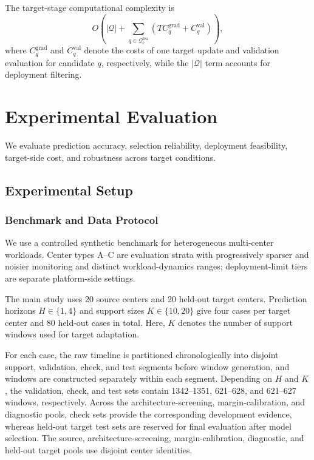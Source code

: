 \documentclass[a4paper,fleqn]{cas-sc}
\begin{document}
The target-stage computational complexity is
\[
O\left(
|\mathcal{Q}|+
\sum_{q\in\mathcal{Q}_{c}^{\mathrm{fea}}}
\left(TC_q^{\mathrm{grad}}+C_q^{\mathrm{val}}\right)
\right),
\]
where $C_q^{\mathrm{grad}}$ and $C_q^{\mathrm{val}}$ denote the costs of one
target update and validation evaluation for candidate $q$, respectively, while
the $|\mathcal{Q}|$ term accounts for deployment filtering.

\section{Experimental Evaluation}
\label{sec:experiments}

We evaluate prediction accuracy, selection reliability, deployment
feasibility, target-side cost, and robustness across target conditions.

\subsection{Experimental Setup}
\label{subsec:experimental-setup}

\subsubsection{Benchmark and Data Protocol}

We use a controlled synthetic benchmark for heterogeneous multi-center
workloads. Center types A--C are evaluation strata with progressively sparser
and noisier monitoring and distinct workload-dynamics ranges; deployment-limit
tiers are separate platform-side settings.

The main study uses 20 source centers and 20 held-out target centers.
Prediction horizons $H\in\{1,4\}$ and support sizes $K\in\{10,20\}$ give
four cases per target center and 80 held-out cases in total. Here, $K$
denotes the number of support windows used for target adaptation.

For each case, the raw timeline is partitioned chronologically into disjoint
support, validation, check, and test segments before window generation, and
windows are constructed separately within each segment. Depending on $H$ and
$K$, the validation, check, and test sets contain 1342--1351, 621--628, and
621--627 windows, respectively. Across the architecture-screening, margin-calibration, and diagnostic pools,
check sets provide the corresponding development evidence, whereas held-out
target test sets are reserved for final evaluation after model selection. The source, architecture-screening,
margin-calibration, diagnostic, and held-out target pools use disjoint center
identities.
\end{document}
